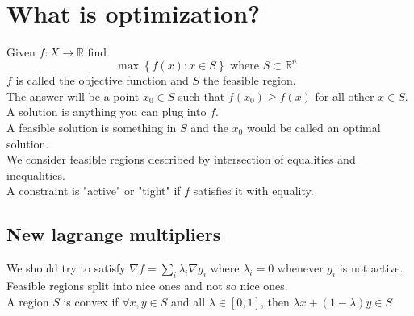 \documentclass[../main.tex]{subfiles}
\begin{document}
\section{What is optimization?}
Given $f:X\to \mathbb{R}$ find
\[ 
\max \left\{ f( x) :x\in S \right\} \text{ where $S \subset \mathbb{R}^n $  } 
\]
$f$ is called the objective function and $S$ the feasible region.\\
The answer will be a point $x_0 \in S$ such that $f( x_0) \geq f( x) $ for all other $x\in S$.\\
A solution is anything you can plug into $f$.\\
A feasible solution is something in $S$ and the $x_0$ would be called an optimal solution.\\
We consider feasible regions described by intersection of equalities and inequalities.\\
A constraint is "active" or "tight" if $f$ satisfies it with equality.
\subsection{New lagrange multipliers}
We should try to satisfy $\nabla f= \sum_i \lambda_i \nabla g_i$ where $\lambda_i=0$ whenever $g_i$ is not active.
Feasible regions split into nice ones and not so nice ones.\\
A region $S$ is convex if $\forall x,y \in S$ and all $\lambda\in [ 0,1] $, then $\lambda x+ ( 1-\lambda) y\in S$ 
\end{document}
